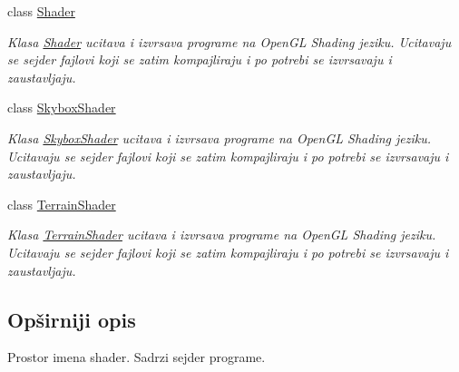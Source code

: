 \begin{DoxyCompactItemize}
class \hyperlink{classshader_1_1Shader}{Shader}
\begin{DoxyCompactList}\small\item\em Klasa \hyperlink{classshader_1_1Shader}{Shader} ucitava i izvrsava programe na Open\+GL Shading jeziku. Ucitavaju se sejder fajlovi koji se zatim kompajliraju i po potrebi se izvrsavaju i zaustavljaju. \end{DoxyCompactList}\item 
class \hyperlink{classshader_1_1SkyboxShader}{Skybox\+Shader}
\begin{DoxyCompactList}\small\item\em Klasa \hyperlink{classshader_1_1SkyboxShader}{Skybox\+Shader} ucitava i izvrsava programe na Open\+GL Shading jeziku. Ucitavaju se sejder fajlovi koji se zatim kompajliraju i po potrebi se izvrsavaju i zaustavljaju. \end{DoxyCompactList}\item 
class \hyperlink{classshader_1_1TerrainShader}{Terrain\+Shader}
\begin{DoxyCompactList}\small\item\em Klasa \hyperlink{classshader_1_1TerrainShader}{Terrain\+Shader} ucitava i izvrsava programe na Open\+GL Shading jeziku. Ucitavaju se sejder fajlovi koji se zatim kompajliraju i po potrebi se izvrsavaju i zaustavljaju. \end{DoxyCompactList}\end{DoxyCompactItemize}


\subsection{Opširniji opis}
Prostor imena shader. Sadrzi sejder programe. 